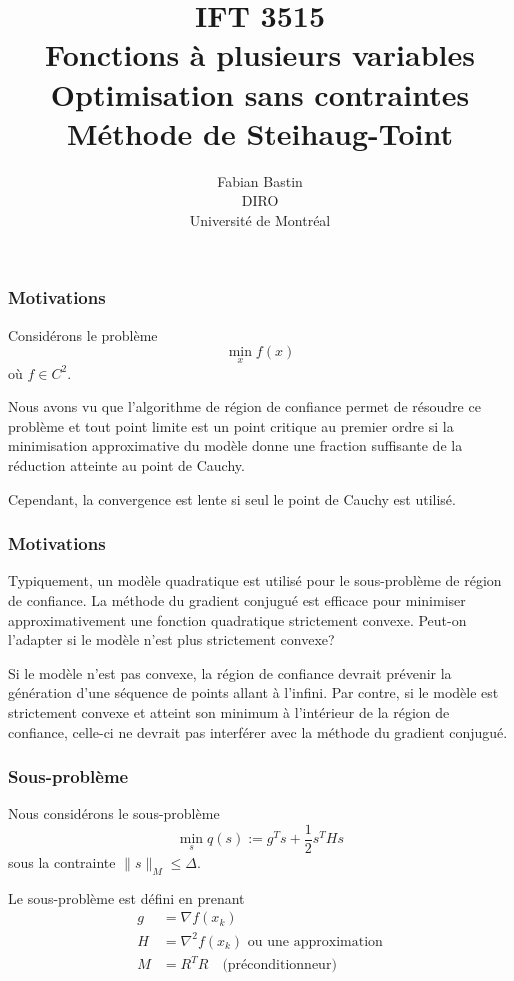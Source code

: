 \documentclass[usepdftitle=false,aspectratio=169]{beamer}
\title[IFT3515]{IFT 3515\\Fonctions à plusieurs variables\\Optimisation sans contraintes\\Méthode de Steihaug-Toint}
\author[Fabian Bastin]{Fabian Bastin\\DIRO\\Université de Montréal}
\date{}
\begin{document}
\frame{\titlepage}


\begin{frame}
\frametitle{Motivations}

Considérons le problème
$$
\min_x f(x)
$$
où $f \in C^2$.

\mbox{}

Nous avons vu que l'algorithme de région de confiance permet de résoudre ce problème et tout point limite est un point critique au premier ordre si la minimisation approximative du modèle donne une fraction suffisante de la réduction atteinte au point de Cauchy.

\mbox{}

Cependant, la convergence est lente si seul le point de Cauchy est utilisé.

\end{frame}

\begin{frame}
\frametitle{Motivations}

Typiquement, un modèle quadratique est utilisé pour le sous-problème de région de confiance.
La méthode du gradient conjugué est efficace pour minimiser approximativement une fonction quadratique strictement convexe. Peut-on l'adapter si le modèle n'est plus strictement convexe?

\mbox{}

Si le modèle n'est pas convexe, la région de confiance devrait prévenir la génération d'une séquence de points allant à l'infini.
Par contre, si le modèle est strictement convexe et atteint son minimum à l'intérieur de la région de confiance, celle-ci ne devrait pas interférer avec la méthode du gradient conjugué.

\end{frame}

\begin{frame}
\frametitle{Sous-problème}

Nous considérons le sous-problème
$$
\min_s q(s) := g^Ts + \frac{1}{2} s^T H s
$$
sous la contrainte $\| s \|_M \leq \Delta$.

\mbox{}

Le sous-problème est défini en prenant
\begin{align*}
g &= \nabla f(x_k) \\
H &= \nabla^2 f(x_k) \text{ ou une approximation}\\
M &= R^TR \quad \text{(préconditionneur)}
\end{align*}

\end{frame}
\end{document}
